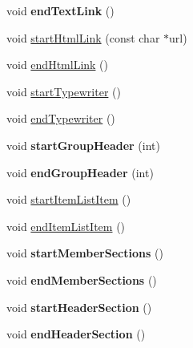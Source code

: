 \begin{DoxyCompactItemize}
\item 
\hypertarget{class_html_generator_a98515ca43c32f8bc616925eb3c683b6e}{void {\bfseries end\-Text\-Link} ()}\label{class_html_generator_a98515ca43c32f8bc616925eb3c683b6e}

\item 
void \hyperlink{class_html_generator_a0746b9c06743e1d4fe527b8317457da1}{start\-Html\-Link} (const char $\ast$url)
\item 
void \hyperlink{class_html_generator_ac2ba450d319270e186e436167c8609ce}{end\-Html\-Link} ()
\item 
void \hyperlink{class_html_generator_a2e60bda5e249554e2fc264aa32d9d93e}{start\-Typewriter} ()
\item 
void \hyperlink{class_html_generator_acb220673316232acd7d1050553dafaf6}{end\-Typewriter} ()
\item 
\hypertarget{class_html_generator_ac9eee86f35f465f0160ccea844c3b80d}{void {\bfseries start\-Group\-Header} (int)}\label{class_html_generator_ac9eee86f35f465f0160ccea844c3b80d}

\item 
\hypertarget{class_html_generator_ae267a69e7fa49c697d1cdce247d81b38}{void {\bfseries end\-Group\-Header} (int)}\label{class_html_generator_ae267a69e7fa49c697d1cdce247d81b38}

\item 
void \hyperlink{class_html_generator_ab4ab0e8996b14723e45e955fe68f03bc}{start\-Item\-List\-Item} ()
\item 
void \hyperlink{class_html_generator_a61efca8a19608566df04a45d16e88449}{end\-Item\-List\-Item} ()
\item 
\hypertarget{class_html_generator_aa363f7f143f8451b0fd035e9856f1b87}{void {\bfseries start\-Member\-Sections} ()}\label{class_html_generator_aa363f7f143f8451b0fd035e9856f1b87}

\item 
\hypertarget{class_html_generator_a2f9645e00372366ad64476dbc66cd5ac}{void {\bfseries end\-Member\-Sections} ()}\label{class_html_generator_a2f9645e00372366ad64476dbc66cd5ac}

\item 
\hypertarget{class_html_generator_add9e7a492a43830dd3c77cd0e5c06884}{void {\bfseries start\-Header\-Section} ()}\label{class_html_generator_add9e7a492a43830dd3c77cd0e5c06884}

\item 
\hypertarget{class_html_generator_aeca202ed7306f7d9aa20f8e707d96301}{void {\bfseries end\-Header\-Section} ()}\label{class_html_generator_aeca202ed7306f7d9aa20f8e707d96301}


\end{DoxyCompactItemize}
